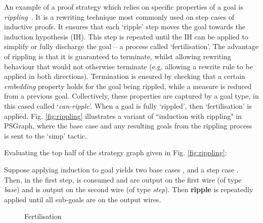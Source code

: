 \documentclass{llncs}
\begin{document}
An example of a proof strategy which relies on specific properties of a goal is \emph{rippling}~\cite{rippling-book}. It is a rewriting technique most commonly used on step cases of inductive proofs. It ensures that each `ripple' step moves the goal towards the induction hypothesis (IH). This step is repeated until the IH can be applied to simplify or fully discharge the goal -- a process called `fertilisation'. The advantage of rippling is that it is guaranteed to terminate, whilst allowing rewriting behaviour that would not otherwise terminate (e.g. allowing a rewrite rule to be applied in both directions). Termination is ensured by checking that a certain \emph{embedding} property holds for the goal being rippled, while a measure is reduced from a previous goal. Collectively, these properties are captured by a goal type, in this cased called `\textit{can-ripple}'. When a goal is fully `rippled', then  `fertilisation' is applied. Fig. \ref{fig:rippling} illustrates a variant of ``induction with rippling" in PSGraph, where the base case and any resulting goals from the rippling process is sent to the `simp' tactic. 


\begin{example}\label{ex:even1}
  Evaluating the top half of the strategy graph given in Fig. \ref{fig:rippling}:
  \begin{center}
  \end{center}
  Suppose applying induction to goal  yields two base cases ,  and a step case . Then, in the first step,  is consumed and  are output on the first wire (of type \textit{base}) and  is output on the second wire (of type \textit{step}). Then \textbf{ripple} is repeatedly applied until all sub-goals are on the output wires.
\end{example}

\begin{figure}\centering
\vspace{-12pt}
 \vspace{-5pt}
 \caption{Fertilisation}\label{fig:fert}
   \vspace{-14pt}
\end{figure}
\end{document}
